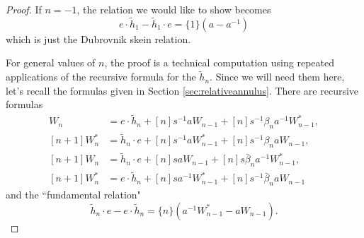 \begin{proof}
If $n=-1$, the relation we would like to show becomes 
\begin{equation*}
e \cdot \tilde{h}_1 - \tilde{h}_1 \cdot e = \{1\} \left( a - a^{-1} \right)
\end{equation*}
which is just the Dubrovnik skein relation. 

For general values of $n$, the proof is a technical computation using repeated applications of the recursive formula for the $\tilde{h}_n$. Since we will need them here, let's recall the formulas given in Section \ref{sec:relativeannulus}. There are recursive formulas
\begin{align}
[n+1] W_n &= e \cdot \tilde{h}_n + [n] s^{-1} a W_{n-1} + [n] s^{-1} \beta_n a^{-1} W^*_{n-1}, \label{eq:r1} \\
[n+1] W^*_n &= \tilde{h}_n \cdot e + [n] s^{-1} a W^*_{n-1} + [n] s^{-1} \beta_n a W_{n-1}, \label{eq:r2} \\
[n+1] W_n &= \tilde{h}_n \cdot e + [n] s a W_{n-1} + [n] s \bar{\beta}_n a^{-1} W^*_{n-1}, \label{eq:r3} \\
[n+1] W^*_n &= e \cdot \tilde{h}_n + [n] s a^{-1} W^*_{n-1} + [n] s^{-1} \bar{\beta}_n a W_{n-1} \label{eq:r4}
\end{align}
and the ``fundamental relation"
\begin{equation}
\tilde{h}_n \cdot e - e \cdot \tilde{h}_n = \{n\} (a^{-1} W^*_{n-1} - a W_{n-1}). \label{eq:f}
\end{equation}


\end{proof}
